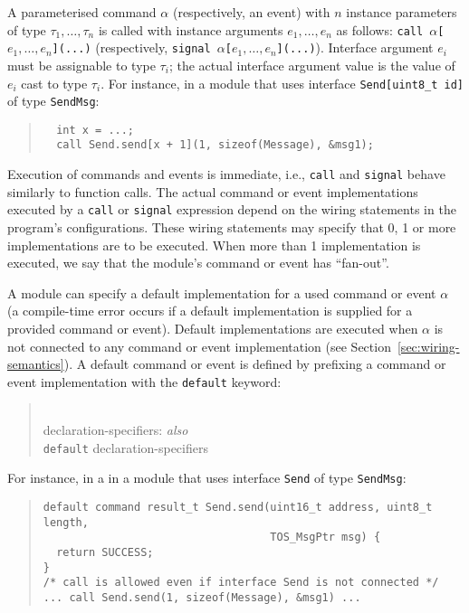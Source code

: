 \documentclass[11pt,letterpaper]{article}
\newcommand{\kw}[1]{{\tt #1}}
\newcommand{\code}[1]{{\tt #1}}
\newcommand{\grammarshift}{\vspace*{-.7cm}}
\newcommand{\grammarindent}{\hspace*{2cm}\= \\ \kill}
\begin{document}
A parameterised command $\alpha$ (respectively, an event) with $n$
instance parameters of type $\tau_1, \ldots, \tau_n$ is called with
instance arguments $e_1, \ldots, e_n$ as follows: \code{call
$\alpha$[$e_1, \ldots, e_n$](...)}  (respectively, \code{signal
$\alpha$[$e_1, \ldots, e_n$](...)}). Interface argument $e_i$
must be assignable to type $\tau_i$; the actual interface argument value
is the value of $e_i$ cast to type $\tau_i$. For instance, in a module that uses
interface \code{Send[uint8\_t id]} of type \kw{SendMsg}:

\begin{quote} \begin{verbatim}
  int x = ...;
  call Send.send[x + 1](1, sizeof(Message), &msg1);
\end{verbatim} \end{quote}

Execution of commands and events is immediate, i.e., \kw{call} and
\kw{signal} behave similarly to function calls. The actual command or event
implementations executed by a \code{call} or \code{signal} expression
depend on the wiring statements in the program's configurations. These
wiring statements may specify that 0, 1 or more implementations are to be
executed. When more than 1 implementation is executed, we say that the
module's command or event has ``fan-out''.  

A module can specify a default implementation for a used command or
event $\alpha$ (a compile-time error occurs if a default
implementation is supplied for a provided command or event). Default
implementations are executed when $\alpha$ is not connected to any
command or event implementation (see
Section~\ref{sec:wiring-semantics}). A default command or event is
defined by prefixing a command or event implementation with the
\kw{default} keyword:
\begin{quote} \grammarshift \em \begin{tabbing}
\grammarindent
declaration-specifiers: \emph{also}\\
\>	\kw{default} declaration-specifiers\\
\end{tabbing} \end{quote}
For instance, in a in a module that uses interface \code{Send} of type
\kw{SendMsg}:
\begin{quote} \begin{verbatim}
default command result_t Send.send(uint16_t address, uint8_t length, 
                                   TOS_MsgPtr msg) {
  return SUCCESS;
}
/* call is allowed even if interface Send is not connected */
... call Send.send(1, sizeof(Message), &msg1) ...
\end{verbatim} \end{quote}
\end{document}
